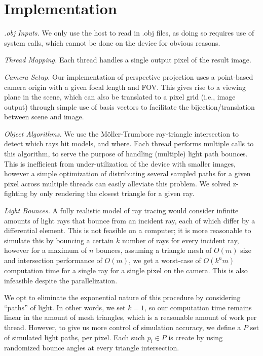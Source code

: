 \documentclass[../main.tex]{subfiles}
\begin{document}
\section{Implementation}


\emph{.obj Inputs.} We only use the host to read in .obj files, as doing so
requires use of system calls, which cannot be done on the device for obvious
reasons.

\emph{Thread Mapping.} Each thread handles a single output pixel of the result image.

\emph{Camera Setup.} Our implementation of perspective projection uses a
point-based camera origin with a given focal length and FOV. This gives rise to
a viewing plane in the scene, which can also be translated to a pixel grid
(i.e., image output) through simple use of basis vectors to facilitate the
bijection/translation between scene and image.

\emph{Object Algorithms.} We use the M\"oller-Trumbore ray-triangle
intersection to detect which rays hit models, and where. Each thread performs
multiple calls to this algorithm, to serve the purpose of handling (multiple) light path bounces.
This is inefficient from under-utilization of the device with smaller images, 
however a simple optimization of distributing several sampled paths for a given pixel
across multiple threads can easily alleviate this problem. We solved z-fighting by
only rendering the closest triangle for a given ray.

\emph{Light Bounces.} A fully realistic model of ray tracing would consider infinite amounts
of light rays that bounce from an incident ray, each of which differ by a differential element.
This is not feasible on a computer; it is more reasonable to simulate this by bouncing a certain
\(k\) number of rays for every incident ray, however for a maximum of \(n\) bounces,
assuming a triangle mesh of \(O(m)\) size and intersection performance of \(O(m)\),
we get a worst-case of \(O(k^n m)\) computation time for a single ray for a single
pixel on the camera. This is also infeasible despite the parallelization.

We opt to eliminate the exponential nature of this procedure by considering ``paths'' of light.
In other words, we set \(k=1\), so our computation time remains linear in the amount
of mesh triangles, which is a reasonable amount of work per thread. However, to give us
more control of simulation accuracy, we define a \(P\) set of simulated light
paths, per pixel. Each such \(p_i \in P\) is create by using randomized bounce angles
at every triangle intersection.
\end{document}
